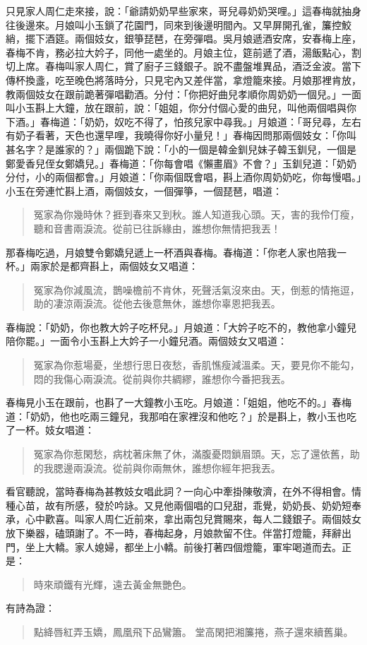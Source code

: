 只見家人周仁走來接，說：「爺請奶奶早些家來，哥兒尋奶奶哭哩。」這春梅就抽身往後邊來。月娘叫小玉鎖了花園門，同來到後邊明間內。又早屏開孔雀，簾控鮫綃，擺下酒筵。兩個妓女，銀箏琵琶，在旁彈唱。吳月娘遞酒安席，安春梅上座，春梅不肯，務必拉大妗子，同他一處坐的。月娘主位，筵前遞了酒，湯飯點心，割切上席。春梅叫家人周仁，賞了廚子三錢銀子。說不盡盤堆異品，酒泛金波。當下傳杯換盞，吃至晚色將落時分，只見宅內又差伴當，拿燈籠來接。月娘那裡肯放，教兩個妓女在跟前跪著彈唱勸酒。分付：「你把好曲兒孝順你周奶奶一個兒。」一面叫小玉斟上大鐘，放在跟前，說：「姐姐，你分付個心愛的曲兒，叫他兩個唱與你下酒。」春梅道：「奶奶，奴吃不得了，怕孩兒家中尋我。」月娘道：「哥兒尋，左右有奶子看著，天色也還早哩，我曉得你好小量兒！」春梅因問那兩個妓女：「你叫甚名字？是誰家的？」兩個跪下說：「小的一個是韓金釧兒妹子韓玉釧兒，一個是鄭愛香兒侄女鄭嬌兒。」春梅道：「你每會唱《懶畫眉》不會？」玉釧兒道：「奶奶分付，小的兩個都會。」月娘道：「你兩個既會唱，斟上酒你周奶奶吃，你每慢唱。」小玉在旁連忙斟上酒，兩個妓女，一個彈箏，一個琵琶，唱道：
\begin{quote}
冤家為你幾時休？捱到春來又到秋。誰人知道我心頭。天，害的我伶仃瘦，聽和音書兩淚流。從前已往訴緣由，誰想你無情把我丟！
\end{quote}

那春梅吃過，月娘雙令鄭嬌兒遞上一杯酒與春梅。春梅道：「你老人家也陪我一杯。」兩家於是都齊斟上，兩個妓女又唱道：
\begin{quote}
冤家為你減風流，鵲噪檐前不肯休，死聲活氣沒來由。天，倒惹的情拖逗，助的凄涼兩淚流。從他去後意無休，誰想你辜恩把我丟。
\end{quote}

春梅說：「奶奶，你也教大妗子吃杯兒。」月娘道：「大妗子吃不的，教他拿小鐘兒陪你罷。」一面令小玉斟上大妗子一小鐘兒酒。兩個妓女又唱道：
\begin{quote}
冤家為你惹場憂，坐想行思日夜愁，香肌憔瘦減溫柔。天，要見你不能勾，悶的我傷心兩淚流。從前與你共綢繆，誰想你今番把我丟。
\end{quote}

春梅見小玉在跟前，也斟了一大鐘教小玉吃。月娘道：「姐姐，他吃不的。」春梅道：「奶奶，他也吃兩三鐘兒，我那咱在家裡沒和他吃？」於是斟上，教小玉也吃了一杯。妓女唱道：
\begin{quote}
冤家為你惹閑愁，病枕著床無了休，滿腹憂悶鎖眉頭。天，忘了還依舊，助的我腮邊兩淚流。從前與你兩無休，誰想你經年把我丟。
\end{quote}

看官聽說，當時春梅為甚教妓女唱此詞？一向心中牽掛陳敬濟，在外不得相會。情種心苗，故有所感，發於吟詠。又見他兩個唱的口兒甜，乖覺，奶奶長、奶奶短奉承，心中歡喜。叫家人周仁近前來，拿出兩包兒賞賜來，每人二錢銀子。兩個妓女放下樂器，磕頭謝了。不一時，春梅起身，月娘款留不住。伴當打燈籠，拜辭出門，坐上大轎。家人媳婦，都坐上小轎。前後打著四個燈籠，軍牢喝道而去。正是：
\begin{quote}
時來頑鐵有光輝，遠去黃金無艷色。
\end{quote}
有詩為證：
\begin{quote}
點絳唇紅弄玉嬌，鳳凰飛下品鸞簫。
堂高閑把湘簾捲，燕子還來續舊巢。
\end{quote}

